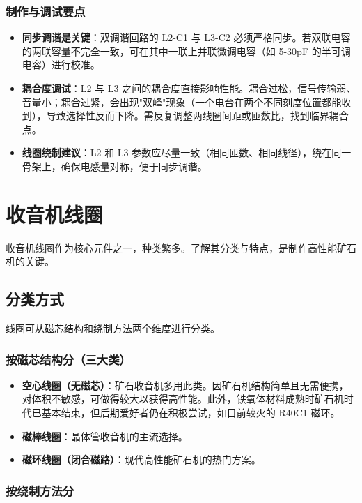 \documentclass[12pt,UTF8]{ctexbook}
\begin{document}
\subsection{制作与调试要点}

\begin{itemize}[leftmargin=2cm]
	\item \textbf{同步调谐是关键}：双调谐回路的 L2-C1 与 L3-C2 必须严格同步。若双联电容的两联容量不完全一致，可在其中一联上并联微调电容（如 5-30pF 的半可调电容）进行校准。
	\item \textbf{耦合度调试}：L2 与 L3 之间的耦合度直接影响性能。耦合过松，信号传输弱、音量小；耦合过紧，会出现"双峰"现象（一个电台在两个不同刻度位置都能收到），导致选择性反而下降。需反复调整两线圈间距或匝数比，找到临界耦合点。
	\item \textbf{线圈绕制建议}：L2 和 L3 参数应尽量一致（相同匝数、相同线径），绕在同一骨架上，确保电感量对称，便于同步调谐。
\end{itemize}


\chapter{收音机线圈}
\label{chap:coils}

收音机线圈作为核心元件之一，种类繁多。了解其分类与特点，是制作高性能矿石机的关键。

\section{分类方式}

线圈可从磁芯结构和绕制方法两个维度进行分类。

\subsection{按磁芯结构分（三大类）}

\begin{itemize}[leftmargin=2cm]
	\item \textbf{空心线圈（无磁芯）}：矿石收音机多用此类。因矿石机结构简单且无需便携，对体积不敏感，可做得较大以获得高性能。此外，铁氧体材料成熟时矿石机时代已基本结束，但后期爱好者仍在积极尝试，如目前较火的 R40C1 磁环。
	\item \textbf{磁棒线圈}：晶体管收音机的主流选择。
	\item \textbf{磁环线圈（闭合磁路）}：现代高性能矿石机的热门方案。
\end{itemize}

\subsection{按绕制方法分}
\end{document}
